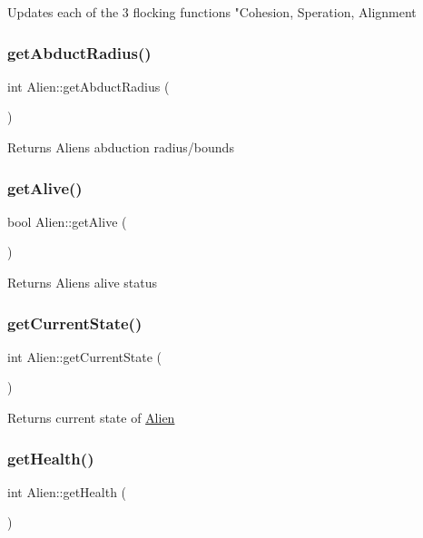 Updates each of the 3 flocking functions "Cohesion, Speration, Alignment \mbox{\label{class_alien_a9dbe59b6c7ec7ad946e113f0f05f7427}} 
\subsubsection{\texorpdfstring{get\+Abduct\+Radius()}{getAbductRadius()}}
{\footnotesize\ttfamily int Alien\+::get\+Abduct\+Radius (\begin{DoxyParamCaption}{ }\end{DoxyParamCaption})}

Returns Aliens abduction radius/bounds \mbox{\label{class_alien_a6da0e947ec0c70d429e54511d67ad608}} 
\subsubsection{\texorpdfstring{get\+Alive()}{getAlive()}}
{\footnotesize\ttfamily bool Alien\+::get\+Alive (\begin{DoxyParamCaption}{ }\end{DoxyParamCaption})}

Returns Aliens alive status \mbox{\label{class_alien_a3165f3c2c824c3784dd0054d48fd5c5a}} 
\subsubsection{\texorpdfstring{get\+Current\+State()}{getCurrentState()}}
{\footnotesize\ttfamily int Alien\+::get\+Current\+State (\begin{DoxyParamCaption}{ }\end{DoxyParamCaption})}

Returns current state of \hyperlink{class_alien}{Alien} \mbox{\label{class_alien_aa83dd26e21c40429865e3f84018545a0}} 
\subsubsection{\texorpdfstring{get\+Health()}{getHealth()}}
{\footnotesize\ttfamily int Alien\+::get\+Health (\begin{DoxyParamCaption}{ }\end{DoxyParamCaption})}

